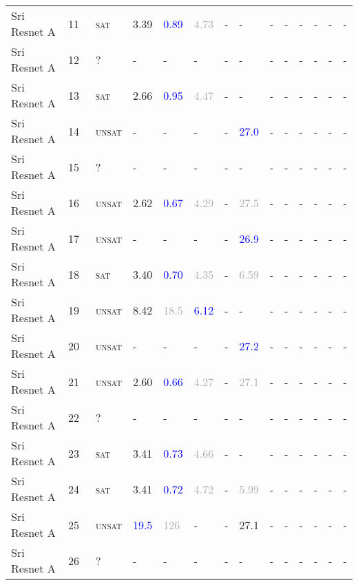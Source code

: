 \begin{center}
{\begin{longtable}{@{}llllllllllllll@{}}
Sri Resnet A & 11 & ~\textsc{sat} & \textcolor{second}{3.39} & \textcolor{blue}{0.89} & \textcolor{darkgray}{4.73} & - & - & - & - & - & - & - & - \\
Sri Resnet A & 12 & ~? & - & - & - & - & - & - & - & - & - & - & - \\
Sri Resnet A & 13 & ~\textsc{sat} & \textcolor{second}{2.66} & \textcolor{blue}{0.95} & \textcolor{darkgray}{4.47} & - & - & - & - & - & - & - & - \\
Sri Resnet A & 14 & ~\textsc{unsat} & - & - & - & - & \textcolor{blue}{27.0} & - & - & - & - & - & - \\
Sri Resnet A & 15 & ~? & - & - & - & - & - & - & - & - & - & - & - \\
Sri Resnet A & 16 & ~\textsc{unsat} & \textcolor{second}{2.62} & \textcolor{blue}{0.67} & \textcolor{darkgray}{4.29} & - & \textcolor{darkgray}{27.5} & - & - & - & - & - & - \\
Sri Resnet A & 17 & ~\textsc{unsat} & - & - & - & - & \textcolor{blue}{26.9} & - & - & - & - & - & - \\
Sri Resnet A & 18 & ~\textsc{sat} & \textcolor{second}{3.40} & \textcolor{blue}{0.70} & \textcolor{darkgray}{4.35} & - & \textcolor{darkgray}{6.59} & - & - & - & - & - & - \\
Sri Resnet A & 19 & ~\textsc{unsat} & \textcolor{second}{8.42} & \textcolor{darkgray}{18.5} & \textcolor{blue}{6.12} & - & - & - & - & - & - & - & - \\
Sri Resnet A & 20 & ~\textsc{unsat} & - & - & - & - & \textcolor{blue}{27.2} & - & - & - & - & - & - \\
Sri Resnet A & 21 & ~\textsc{unsat} & \textcolor{second}{2.60} & \textcolor{blue}{0.66} & \textcolor{darkgray}{4.27} & - & \textcolor{darkgray}{27.1} & - & - & - & - & - & - \\
Sri Resnet A & 22 & ~? & - & - & - & - & - & - & - & - & - & - & - \\
Sri Resnet A & 23 & ~\textsc{sat} & \textcolor{second}{3.41} & \textcolor{blue}{0.73} & \textcolor{darkgray}{4.66} & - & - & - & - & - & - & - & - \\
Sri Resnet A & 24 & ~\textsc{sat} & \textcolor{second}{3.41} & \textcolor{blue}{0.72} & \textcolor{darkgray}{4.72} & - & \textcolor{darkgray}{5.99} & - & - & - & - & - & - \\
Sri Resnet A & 25 & ~\textsc{unsat} & \textcolor{blue}{19.5} & \textcolor{darkgray}{126} & - & - & \textcolor{second}{27.1} & - & - & - & - & - & - \\
Sri Resnet A & 26 & ~? & - & - & - & - & - & - & - & - & - & - & - \\

\end{longtable}}
\end{center}
